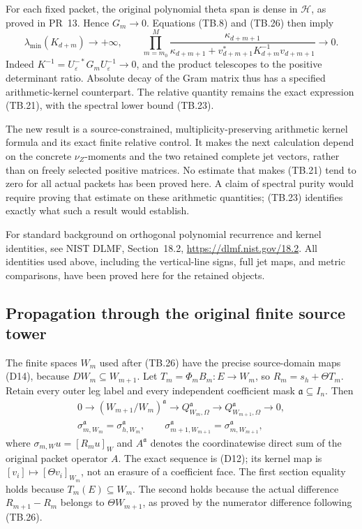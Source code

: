 For each fixed packet, the original polynomial theta span is
dense in \(\mathcal H\), as proved in PR~13.  Hence \(G_m\to0\).
Equations (TB.8) and (TB.26) then imply
\[
 \lambda_{\min}(K_{d+m})\longrightarrow+\infty,\qquad
 \prod_{m=m_0}^{M}\frac{\kappa_{d+m+1}}
 {\kappa_{d+m+1}+v_{d+m+1}^*K_{d+m}^{-1}v_{d+m+1}}
 \longrightarrow0.
 \tag{TB.34}
\]
Indeed \(K^{-1}=U_\varepsilon^{-*}G_mU_\varepsilon^{-1}\to0\),
and the product telescopes to the positive determinant ratio.
Absolute decay of the Gram matrix thus has a specified
arithmetic-kernel counterpart.  The relative quantity remains
the exact expression (TB.21), with the spectral lower bound
(TB.23).

The new result is a source-constrained, multiplicity-preserving
arithmetic kernel formula and its exact finite relative control.
It makes the next calculation depend on the concrete
\(\nu_Z\)-moments and the two retained complete jet vectors,
rather than on freely selected positive matrices.
No estimate that makes (TB.21) tend to zero for all actual
packets has been proved here.  A claim of spectral purity would
require proving that estimate on these arithmetic quantities;
(TB.23) identifies exactly what such a result would establish.

For standard background on orthogonal polynomial recurrence and
kernel identities, see NIST DLMF, Section~18.2,
\url{https://dlmf.nist.gov/18.2}.  All identities used above,
including the vertical-line signs, full jet maps, and metric
comparisons, have been proved here for the retained objects.

\subsection{Propagation through the original finite source tower}
\label{sec:tb-propagated-source-tower}

The finite spaces $W_m$ used after (TB.26) have the precise
source-domain maps (D14), because $DW_m\subseteq W_{m+1}$.
Let $T_m=\Phi_mB_m:E\to W_m$, so
$R_m=s_h+\Theta T_m$.  Retain every outer leg label and every
independent coefficient mask $\mathfrak a\subseteq I_n$.  Then
\[
\begin{gathered}
0\to(W_{m+1}/W_m)^{\mathfrak a}\to Q_{W_m,\Omega}^{\mathfrak a}
       \to Q_{W_{m+1},\Omega}^{\mathfrak a}\to0,\\
\sigma_{m,W_m}^{\mathfrak a}=\sigma_{h,W_m}^{\mathfrak a},
\qquad \sigma_{m+1,W_{m+1}}^{\mathfrak a}=\sigma_{m,W_{m+1}}^{\mathfrak a},
\end{gathered}
\tag{TB.37}
\]
where $\sigma_{m,W}u=[R_mu]_W$ and $A^{\mathfrak a}$ denotes the coordinatewise direct sum of the original packet operator $A$.  The exact sequence is (D12);
its kernel map is $[v_i]\mapsto[\Theta v_i]_{W_m}$, not an
erasure of a coefficient face.  The first section equality holds
because $T_m(E)\subseteq W_m$.  The second holds because the
actual difference $R_{m+1}-R_m$ belongs to $\Theta W_{m+1}$,
as proved by the numerator difference following (TB.26).

